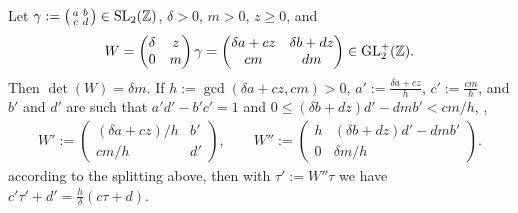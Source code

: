 \documentclass{article}
\begin{document}
\begingroup
\newcommand{\h}{h}
\begin{Lemma}\label{thm:c*tau+d}
  Let $\gamma := \left(
    \begin{smallmatrix}a&b\\c&d\end{smallmatrix} \right)\in
  \SL2Z$, $\delta>0$, $m>0$, $z\ge0$, and
  \begin{gather*}
    W=
    \begin{pmatrix}
      \delta & z\\
      0      & m
    \end{pmatrix}
    \gamma
    = \begin{pmatrix}
        \delta a + c z & \delta b + d z\\
        c m & d m
      \end{pmatrix}
    \in \mathrm{GL}_2^+(\mathbb{Z}).
  \end{gather*}
  Then $\det(W)=\delta m$.
  If
  $\h:=\gcd(\delta a + c z, cm)>0$,
  $a':=\frac{\delta a + c z}{\h}$,
  $c':=\frac{c m}{\h}$, and
  $b'$ and $d'$ are such that $a'd'-b'c'=1$ and
  $0 \le (\delta b + d z) d' - d m b' < cm / \h$, \ie,
  \begin{gather*}
    W':=\begin{pmatrix}
      (\delta a + c z) / \h & b'\\
      c m / \h              & d'
    \end{pmatrix},
    \qquad
    W''
    :=
    \begin{pmatrix}
      \h & (\delta b + d z) d' - d m b'\\
      0  & \delta m / \h
    \end{pmatrix}.
  \end{gather*}
  according to the splitting above,
  then with $\tau':=W''\tau$ we have
  $c'\tau'+d' = \frac{\h}{\delta} (c\tau + d)$.
\end{Lemma}
\end{document}
